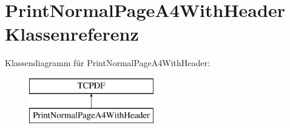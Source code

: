 \hypertarget{class_print_normal_page_a4_with_header}{}\section{Print\+Normal\+Page\+A4\+With\+Header Klassenreferenz}
\label{class_print_normal_page_a4_with_header}
Klassendiagramm für Print\+Normal\+Page\+A4\+With\+Header\+:\begin{figure}[H]
\begin{center}
\leavevmode
\includegraphics[height=2.000000cm]{class_print_normal_page_a4_with_header}
\end{center}
\end{figure}

